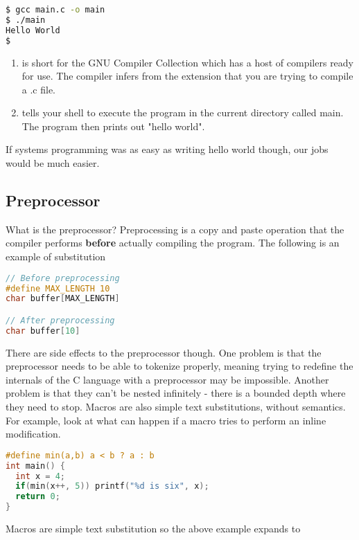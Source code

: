 \begin{lstlisting}[language=bash]
$ gcc main.c -o main
$ ./main
Hello World
$
\end{lstlisting}

\begin{enumerate}
\item {} is short for the GNU Compiler Collection which has a host of compilers ready for use.
  The compiler infers from the extension that you are trying to compile a .c file.
\item {} tells your shell to execute the program in the current directory called main.
  The program then prints out "hello world".
\end{enumerate}

If systems programming was as easy as writing hello world though, our jobs would be much easier.

\subsection{Preprocessor}

What is the preprocessor?
Preprocessing is a copy and paste operation that the compiler performs \textbf{before} actually compiling the program.
The following is an example of substitution

\begin{lstlisting}[language=C]
// Before preprocessing
#define MAX_LENGTH 10
char buffer[MAX_LENGTH]

// After preprocessing
char buffer[10]
\end{lstlisting}

There are side effects to the preprocessor though.
One problem is that the preprocessor needs to be able to tokenize properly, meaning trying to redefine the internals of the C language with a preprocessor may be impossible.
Another problem is that they can't be nested infinitely - there is a bounded depth where they need to stop.
Macros are also simple text substitutions, without semantics.
For example, look at what can happen if a macro tries to perform an inline modification.

\begin{lstlisting}[language=C]
#define min(a,b) a < b ? a : b
int main() {
  int x = 4;
  if(min(x++, 5)) printf("%d is six", x);
  return 0;
}
\end{lstlisting}

Macros are simple text substitution so the above example expands to

